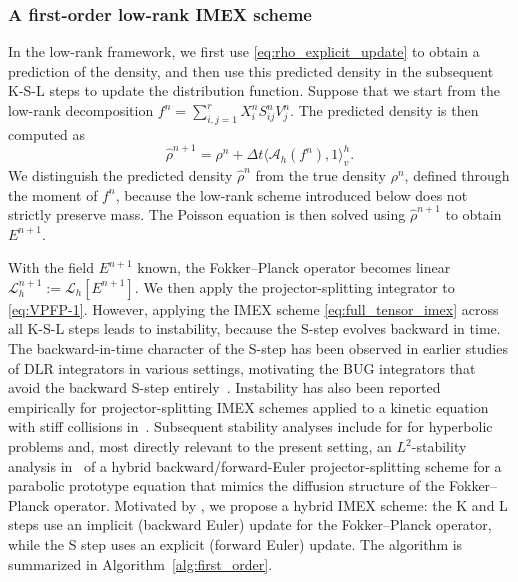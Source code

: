 \documentclass[]{article}
\numberwithin{equation}{section}
\newcommand{\modifysecond}[1]{#1}
\begin{document}
\subsubsection{A first-order low-rank IMEX scheme}
\label{sec:first_order_DLR}

In the low-rank framework, we first use \eqref{eq:rho_explicit_update} to obtain a prediction of the density, and then use this predicted density in the subsequent K-S-L steps to update the distribution function. Suppose that we start from the low-rank decomposition $f^n=\sum_{i,j=1}^r X_i^nS_{ij}^nV_j^n$. The predicted density is then computed as
\begin{equation}\label{eq:rho_hat_update}
    \hat{\rho}^{n+1} = \rho^n + \Delta t \langle \mathcal{A}_h(f^n), 1 \rangle_v^h.
\end{equation}
We distinguish the predicted density $\hat{\rho}^n$ from the true density $\rho^n$, defined through the moment of $f^n$, because the low-rank scheme introduced below does not strictly preserve mass. The Poisson equation is then solved using $\hat{\rho}^{n+1}$ to obtain $E^{n+1}$.

With the field $E^{n+1}$ known, the Fokker--Planck operator becomes linear $\mathcal{L}_h^{n+1} := \mathcal{L}_h[E^{n+1}]$. We then apply the projector-splitting integrator to \eqref{eq:VPFP-1}. However, applying the IMEX scheme  \eqref{eq:full_tensor_imex} across all K-S-L steps leads to instability, because the S-step evolves backward in time. \modifysecond{The backward-in-time character of the S-step has been observed in earlier studies of DLR integrators in various settings, motivating the BUG integrators that avoid the backward S-step entirely~\cite{ceruti2022unconventional,CKL22}.  Instability has also been reported empirically for projector-splitting IMEX schemes applied to a kinetic equation with stiff collisions in~\cite{coughlin2022efficient}.  Subsequent stability analyses include \cite{kusch2023stability} for for hyperbolic problems and, most directly relevant to the present setting, an $L^2$-stability analysis in~\cite{zhang2025stability} of a hybrid backward/forward-Euler projector-splitting scheme for a parabolic prototype equation that mimics the diffusion structure of the Fokker--Planck operator.}  Motivated by \cite{zhang2025stability}, we propose a hybrid IMEX scheme: the K and L steps use an implicit (backward Euler) update for the Fokker--Planck operator, while the S step uses an explicit (forward Euler) update. The algorithm is summarized in Algorithm~\ref{alg:first_order}.
\end{document}
